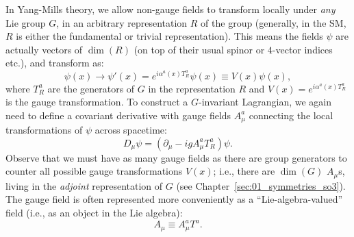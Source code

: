 In Yang-Mills theory, we allow non-gauge fields to transform locally under \textit{any} Lie group $G$, in an arbitrary representation $R$ of the group (generally, in the SM, $R$ is either the fundamental or trivial representation).
This means the fields $\psi$ are actually vectors of $\dim(R)$ (on top of their usual spinor or $4$-vector indices etc.), and transform as:
\begin{equation}
	\label{eq:01_qft_gt_yangmills_transformation}
	\psi(x) \rightarrow \psi'(x) = e^{i\alpha^a(x)T_R^a}\psi(x) \equiv V(x) \psi(x),
\end{equation}
where $T_R^a$ are the generators of $G$ in the representation $R$ and $V(x) = e^{i\alpha^a(x)T_R^a}$ is the gauge transformation.
To construct a $G$-invariant Lagrangian, we again need to define a covariant derivative with gauge fields $A_\mu^a$ connecting the local transformations of $\psi$ across spacetime:
\begin{equation}
	\label{eq:01_qft_gt_yangmills_dmu}
	D_\mu\psi = (\partial_\mu - igA_\mu^aT_R^a)\psi.
\end{equation}
Observe that we must have as many gauge fields as there are group generators to counter all possible gauge transformations $V(x)$; i.e., there are $\dim(G)$ $A_\mu$s, living in the \textit{adjoint} representation of $G$ (see Chapter~\ref{sec:01_symmetries_so3}).
The gauge field is often represented more conveniently as a ``Lie-algebra-valued'' field (i.e., as an object in the Lie algebra):
\begin{equation}
	\label{eq:01_qft_gt_yangmills_gauge_field}
	A_\mu \equiv A_\mu^aT^a.
\end{equation}

